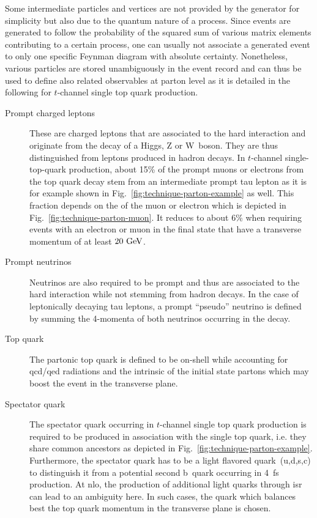 Some intermediate particles and vertices are not provided by the generator for simplicity but also due to the quantum nature of a process. Since events are generated to follow the probability of the squared sum of various matrix elements contributing to a certain process, one can usually not associate a generated event to only one specific Feynman diagram with absolute certainty. Nonetheless, various particles are  stored unambiguously in the event record and can thus be used to define also related observables at parton level as it is detailed in the following for $t$-channel single top quark production.
\begin{description}
\item[Prompt charged leptons] These are charged leptons that are associated to the hard interaction and originate from the decay of a Higgs, Z or W~boson. They are thus distinguished from leptons produced in hadron decays. In $t$-channel single-top-quark production, about 15\% of the prompt muons or electrons from the top quark decay stem from an intermediate prompt tau lepton as it is for example shown in Fig.~\ref{fig:technique-parton-example} as well. This fraction depends on the \pt of the muon or electron which is depicted in Fig.~\ref{fig:technique-parton-muon}. It reduces to about 6\% when requiring events with an electron or muon in the final state that have a transverse momentum of at least $20~\mathrm{GeV}$.
\item[Prompt neutrinos] Neutrinos are also required to be prompt and thus are associated to the hard interaction while not stemming from hadron decays. In the case of leptonically decaying tau leptons, a prompt ``pseudo'' neutrino is defined by summing the 4-momenta of both neutrinos occurring in the decay.
\item[Top quark] The partonic top quark is defined to be on-shell while accounting for \gls{qcd}/\gls{qed} radiations and the intrinsic \kt of the initial state partons which may boost the event in the transverse plane.
\item[Spectator quark] The spectator quark occurring in $t$-channel single top quark production is required to be produced in association with the single top quark, i.e. they share common ancestors as depicted in Fig.~\ref{fig:technique-parton-example}. Furthermore, the spectator quark has to be a light flavored quark~(u,d,s,c) to distinguish it from a potential second b~quark occurring in 4~\gls{fs} production. At \gls{nlo}, the production of additional light quarks through \gls{isr} can lead to an ambiguity here. In such cases, the quark which balances best the top quark momentum in the transverse plane is chosen.
\end{description}

